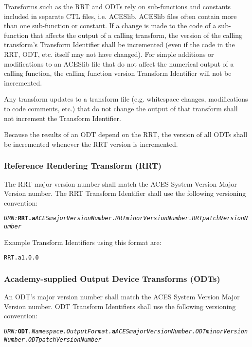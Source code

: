 Transforms such as the RRT and ODTs rely on sub-functions and constants included in separate CTL files, i.e. ACESlib. ACESlib files often contain more than one sub-function or constant. If a change is made to the code of a sub-function that affects the output of a calling transform, the version of the calling transform's Transform Identifier shall be incremented (even if the code in the RRT, ODT, etc. itself may not have changed). For simple additions or modifications to an ACESlib file that do not affect the numerical output of a calling function, the calling function version Transform Identifier will not be incremented. 

Any transform updates to a transform file (e.g. whitespace changes, modifications to code comments, etc.) that do not change the output of that transform shall not increment the Transform Identifier.

Because the results of an ODT depend on the RRT, the version of all ODTs shall be incremented whenever the RRT version is incremented.

\subsubsection{Reference Rendering Transform (RRT)}
The RRT major version number shall match the ACES System Version Major Version number. The RRT Transform Identifier shall use the following versioning convention:

\texttt{\textit{URN:}\textbf{RRT.a}\textit{ACESmajorVersionNumber.RRTminorVersionNumber.RRTpatchVersionNumber}}

Example Transform Identifiers using this format are: 
\begin{listize}
	\item {\small \texttt{\urn{}RRT.a1.0.0}}
\end{listize}

\subsubsection{Academy-supplied Output Device Transforms (ODTs)}
An ODT's major version number shall match the ACES System Version Major Version number. ODT Transform Identifiers shall use the following versioning convention:

\begin{sloppypar}
\texttt{\textit{URN:}\textbf{ODT}\textit{.Namespace.OutputFormat.\+}\textbf{a}\textit{ACESmajorVersionNumber.\+ODTminor\+Version\+Number.ODTpatchVersion\+Number}}
\end{sloppypar}

